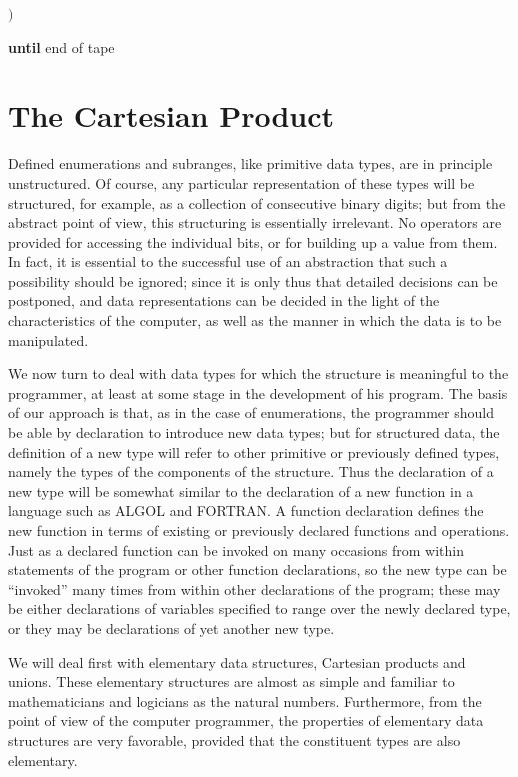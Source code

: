 \documentclass[twoside,11pt]{book}
\begin{document}
\quad $)$

\textbf{until} end of tape

\section[The Cartesian product]{The Cartesian Product}

Defined enumerations and subranges, like primitive data types, are in principle unstructured. Of course, any particular representation of these types will be structured, for example, as a collection of consecutive binary digits; but from the abstract point of view, this structuring is essentially irrelevant. No operators are provided for accessing the individual bits, or for building up a value from them. In fact, it is essential to the successful use of an abstraction that such a possibility should be ignored; since it is only thus that detailed decisions can be postponed, and data representations can be decided in the light of the characteristics of the computer, as well as the manner in which the data is to be manipulated.

We now turn to deal with data types for which the structure is meaningful to the programmer, at least at some stage in the development of his program. The basis of our approach is that, as in the case of enumerations, the programmer should be able by declaration to introduce new data types; but for structured data, the definition of a new type will refer to other primitive or previously defined types, namely the types of the components of the structure. Thus the declaration of a new type will be somewhat similar to the declaration of a new function in a language such as ALGOL and FORTRAN. A function declaration defines the new function in terms of existing or previously declared functions and operations. Just as a declared function can be invoked on many occasions from within statements of the program or other function declarations, so the new type can be ``invoked'' many times from within other declarations of the program; these may be either declarations of variables specified to range over the newly declared type, or they may be declarations of yet another new type.

We will deal first with elementary data structures, Cartesian products and unions. These elementary structures are almost as simple and familiar to mathematicians and logicians as the natural numbers. Furthermore, from the point of view of the computer programmer, the properties of elementary data structures are very favorable, provided that the constituent types are also elementary.
\end{document}

